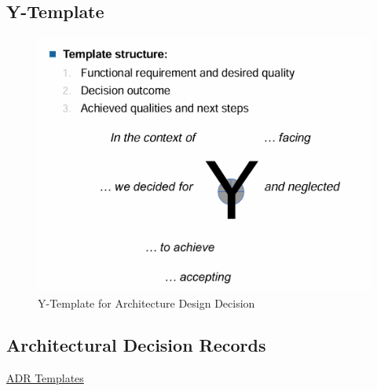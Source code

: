 \documentclass[../Main.tex]{subfiles}
\begin{document}
\subsection{Y-Template}
\begin{figure}[H]
    \centering
    \includegraphics{Images/yarchitecturedesign.png}
    \caption{Y-Template for Architecture Design Decision}
    \label{fig:yarchdesigndecision}
\end{figure}

\newpage
\subsection{Architectural Decision Records}
\href{https://adr.github.io/}{ADR Templates}
\end{document}
